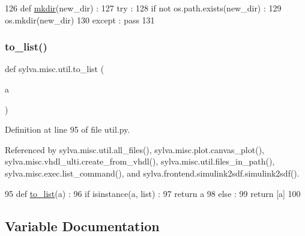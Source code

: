 \begin{DoxyCode}
126 \textcolor{keyword}{def }\hyperlink{namespacesylva_1_1misc_1_1util_af426e429c40209bbb46e3a0e8f139a44}{mkdir}(new\_dir) :
127   \textcolor{keywordflow}{try} :
128     \textcolor{keywordflow}{if} \textcolor{keywordflow}{not} os.path.exists(new\_dir) :
129       os.mkdir(new\_dir)
130   \textcolor{keywordflow}{except} : \textcolor{keywordflow}{pass}
131 
\end{DoxyCode}
\mbox{\label{namespacesylva_1_1misc_1_1util_a03f5cfd365a10a5ec0567e320f987a9b}} 
\subsubsection{\texorpdfstring{to\+\_\+list()}{to\_list()}}
{\footnotesize\ttfamily def sylva.\+misc.\+util.\+to\+\_\+list (\begin{DoxyParamCaption}\item[{}]{a }\end{DoxyParamCaption})}



Definition at line 95 of file util.\+py.



Referenced by sylva.\+misc.\+util.\+all\+\_\+files(), sylva.\+misc.\+plot.\+canvas\+\_\+plot(), sylva.\+misc.\+vhdl\+\_\+ulti.\+create\+\_\+from\+\_\+vhdl(), sylva.\+misc.\+util.\+files\+\_\+in\+\_\+path(), sylva.\+misc.\+exec.\+list\+\_\+command(), and sylva.\+frontend.\+simulink2sdf.\+simulink2sdf().


\begin{DoxyCode}
95 \textcolor{keyword}{def }\hyperlink{namespacesylva_1_1misc_1_1util_a03f5cfd365a10a5ec0567e320f987a9b}{to\_list}(a) :
96   \textcolor{keywordflow}{if} isinstance(a, list) :
97     \textcolor{keywordflow}{return} a
98   \textcolor{keywordflow}{else} :
99     \textcolor{keywordflow}{return} [a]
100 
\end{DoxyCode}


\subsection{Variable Documentation}
\mbox{\label{namespacesylva_1_1misc_1_1util_a1111366860ec15b68260a43ac632d257}} 
